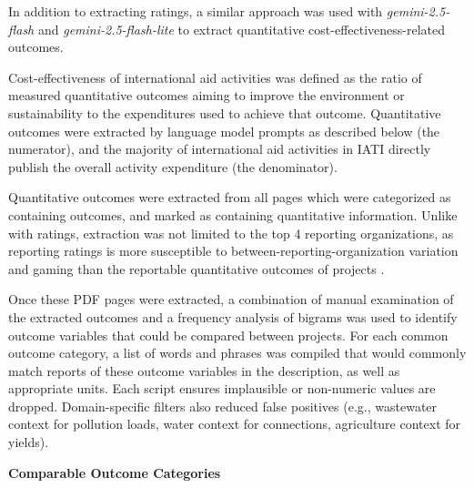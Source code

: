 \FloatBarrier
{}
In addition to extracting ratings, a similar approach was used with \emph{gemini-2.5-flash} and \emph{gemini-2.5-flash-lite} to extract quantitative cost-effectiveness-related outcomes. 

Cost-effectiveness of international aid activities was defined as the ratio of measured quantitative outcomes aiming to improve the environment or sustainability to the expenditures used to achieve that outcome. Quantitative outcomes were extracted by language model prompts as described below (the numerator), and the majority of international aid activities in IATI directly publish the overall activity expenditure (the denominator). 

Quantitative outcomes were extracted from all pages which were categorized as containing outcomes, and marked as containing quantitative information. Unlike with ratings, extraction was not limited to the top 4 reporting organizations, as reporting ratings is more susceptible to between-reporting-organization variation and gaming than the reportable quantitative outcomes of projects \citep{goldembergMindingGapAid2025}.

Once these PDF pages were extracted, a combination of manual examination of the extracted outcomes and a frequency analysis of bigrams was used to identify outcome variables that could be compared between projects. For each common outcome category, a list of words and phrases was compiled that would commonly match reports of these outcome variables in the description, as well as appropriate units. Each script ensures implausible or non-numeric values are dropped. Domain-specific filters also reduced false positives (e.g., wastewater context for pollution loads, water context for connections, agriculture context for yields).


\textbf{Comparable Outcome Categories}

